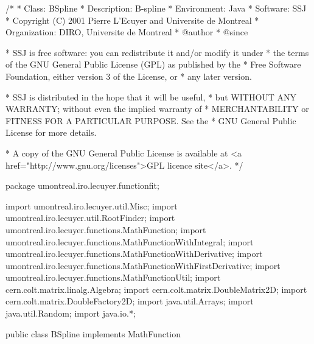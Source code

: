 \begin{code}
\begin{hide}
/*
 * Class:        BSpline
 * Description:  B-spline
 * Environment:  Java
 * Software:     SSJ 
 * Copyright (C) 2001  Pierre L'Ecuyer and Universite de Montreal
 * Organization: DIRO, Universite de Montreal
 * @author       
 * @since

 * SSJ is free software: you can redistribute it and/or modify it under
 * the terms of the GNU General Public License (GPL) as published by the
 * Free Software Foundation, either version 3 of the License, or
 * any later version.

 * SSJ is distributed in the hope that it will be useful,
 * but WITHOUT ANY WARRANTY; without even the implied warranty of
 * MERCHANTABILITY or FITNESS FOR A PARTICULAR PURPOSE.  See the
 * GNU General Public License for more details.

 * A copy of the GNU General Public License is available at
   <a href="http://www.gnu.org/licenses">GPL licence site</a>.
 */
\end{hide}
package umontreal.iro.lecuyer.functionfit;\begin{hide}

import umontreal.iro.lecuyer.util.Misc;
import umontreal.iro.lecuyer.util.RootFinder;
import umontreal.iro.lecuyer.functions.MathFunction;
import umontreal.iro.lecuyer.functions.MathFunctionWithIntegral;
import umontreal.iro.lecuyer.functions.MathFunctionWithDerivative;
import umontreal.iro.lecuyer.functions.MathFunctionWithFirstDerivative;
import umontreal.iro.lecuyer.functions.MathFunctionUtil;
import cern.colt.matrix.linalg.Algebra;
import cern.colt.matrix.DoubleMatrix2D;
import cern.colt.matrix.DoubleFactory2D;
import java.util.Arrays;
import java.util.Random;
import java.io.*;
\end{hide}

public class BSpline implements MathFunction\begin{hide}

,
MathFunctionWithIntegral, MathFunctionWithDerivative, MathFunctionWithFirstDerivative{
   // Formula taken from http://www.ibiblio.org/e-notes/Splines/Basis.htm
   // and http://en.wikipedia.org/wiki/De_Boor_algorithm
   private double[] x;     //x original
   private double[] y;     //y original

   private int degree;

   //variables sur lesquelles on travaille
   private double[] myX;
   private double[] myY;
   private double[] knots;
\end{hide}
\end{code}

